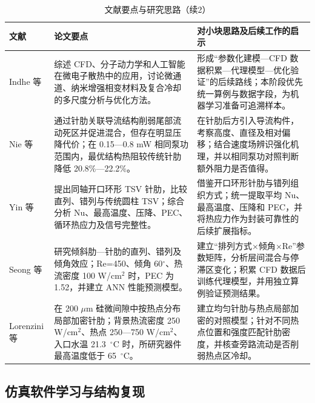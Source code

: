 \documentclass[stage1,fontset=fandol]{ydzjreport}
\begin{document}
	\begin{table}[H]
	  \centering
	  \small
	  \renewcommand{\arraystretch}{1.12}
	  \caption{文献要点与研究思路（续2）}
	  \label{tab:notes-cont-5}
	  \begin{tabularx}{\textwidth}{@{}>{\RaggedRight\arraybackslash}p{} Y Y@{}}
	    \toprule
{} 文献 & 论文要点 & 对小块思路及后续工作的启示 \\
	    \midrule
	    Indhe 等\cite{ref20} & 综述 CFD、分子动力学和人工智能在微电子散热中的应用，讨论微通道、纳米增强相变材料及复合冷却的多尺度分析与优化方法。 & 形成“参数化建模—CFD 数据积累—代理模型—优化验证”的后续路线；本阶段优先统一算例与数据字段，为机器学习准备可追溯样本。 \\[3pt]
	    Nie 等\cite{ref21} & 通过针肋关联导流结构削弱尾部流动死区并促进混合，但存在明显压降代价；在 0.15—0.8 mW 相同泵功范围内，最优结构热阻较传统针肋降低 20.8\%—22.2\%。 & 在针肋后方引入导流构件，考察高度、直径及相对偏移；结合速度场辨识强化机理，并以相同泵功对照判断额外阻力是否值得。 \\[3pt]
	    Yin 等\cite{yin} & 提出同轴开口环形 TSV 针肋，比较直列、错列与传统圆柱 TSV；综合分析 Nu、最高温度、压降、PEC、循环热应力及信号完整性。 & 借鉴开口环形针肋与错列组织方式；统一提取平均 Nu、最高温度、压降和 PEC，并将热应力作为封装可靠性的后续扩展指标。 \\[3pt]
	    Seong 等\cite{seong} & 研究倾斜肋—针肋的直列、错列及倾角效应；Re=450、倾角 60$^\circ$、热流密度 100 W/cm$^2$ 时，PEC 为 1.52，并建立 ANN 性能预测模型。 & 建立“排列方式$\times$倾角$\times$Re”参数矩阵，分析层间混合与停滞区变化；积累 CFD 数据后训练代理模型，并用独立算例验证预测结果。 \\[3pt]
	    Lorenzini 等\cite{ref24} & 在 200 $\mu$m 硅微间隙中按热点分布局部加密针肋；背景热流密度 250 W/cm$^2$、热点 250—750 W/cm$^2$、入口水温 21.3 $\,{}^\circ\mathrm{C}$ 时，所研究器件最高温度低于 65 $\,{}^\circ\mathrm{C}$。 & 建立均匀针肋与热点局部加密的对照模型；针对不同热点位置和强度匹配针肋密度，并核查旁路流动是否削弱热点区冷却。 \\[3pt]

	    \bottomrule
	  \end{tabularx}
	\end{table}




\subsection{仿真软件学习与结构复现}
\end{document}
